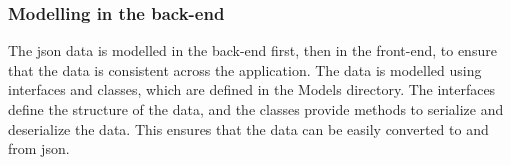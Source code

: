 
\subsubsection{Modelling in the back-end}
The \acrshort{json} data is modelled in the back-end first, then in the front-end, to ensure that the data is consistent across the
application. The data is modelled using interfaces and classes, which are defined in the Models directory. The interfaces define the
structure of the data, and the classes provide methods to serialize and deserialize the data. This ensures that the data can be easily
converted to and from \acrshort{json}.

